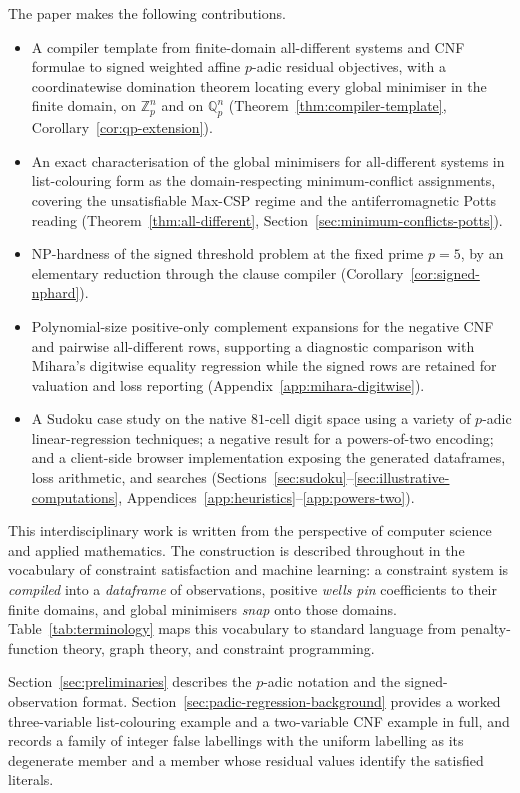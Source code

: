 \documentclass[11pt]{article}
\begin{document}
The paper makes the following contributions.
\begin{itemize}
\item A compiler template from finite-domain all-different systems and CNF formulae to signed weighted affine \(p\)-adic residual objectives, with a coordinatewise domination theorem locating every global minimiser in the finite domain, on \(\mathbb Z_p^n\) and on \(\mathbb Q_p^n\) (Theorem~\ref{thm:compiler-template}, Corollary~\ref{cor:qp-extension}).
\item An exact characterisation of the global minimisers for all-different systems in list-colouring form as the domain-respecting minimum-conflict assignments, covering the unsatisfiable Max-CSP regime and the antiferromagnetic Potts reading (Theorem~\ref{thm:all-different}, Section~\ref{sec:minimum-conflicts-potts}).
\item NP-hardness of the signed threshold problem at the fixed prime \(p=5\), by an elementary reduction through the clause compiler (Corollary~\ref{cor:signed-nphard}).
\item Polynomial-size positive-only complement expansions for the negative CNF and pairwise all-different rows, supporting a diagnostic comparison with Mihara's digitwise equality regression while the signed rows are retained for valuation and loss reporting (Appendix~\ref{app:mihara-digitwise}).
\item A Sudoku case study on the native \(81\)-cell digit space using a variety of \(p\)-adic linear-regression techniques; a negative result for a powers-of-two encoding; and a client-side browser implementation exposing the generated dataframes, loss arithmetic, and searches (Sections~\ref{sec:sudoku}--\ref{sec:illustrative-computations}, Appendices~\ref{app:heuristics}--\ref{app:powers-two}).
\end{itemize}

This interdisciplinary work is written from the perspective of computer science and applied mathematics.
The construction is described throughout in the vocabulary of constraint satisfaction and machine learning: a constraint system is \emph{compiled} into a \emph{dataframe} of observations, positive \emph{wells} \emph{pin} coefficients to their finite domains, and global minimisers \emph{snap} onto those domains. Table~\ref{tab:terminology} maps this vocabulary to standard language from penalty-function theory, graph theory, and constraint programming.

Section~\ref{sec:preliminaries} describes the \(p\)-adic notation and the signed-observation format.
Section~\ref{sec:padic-regression-background} provides a worked three-variable list-colouring example and a two-variable CNF example in full, and records a family of integer false labellings with the uniform labelling as its degenerate member and a member whose residual values identify the satisfied literals.
\end{document}
